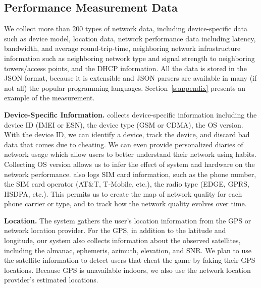 \subsection{Performance Measurement Data}
\label{ss:measurements}
We collect more than 200 types of network data, including device-specific data such as device model,
location data, network performance data including latency, bandwidth, and average round-trip-time,
neighboring network infrastructure information such as neighboring network type and signal strength to
neighboring towers/access points, and the DHCP information. All the data is stored in the JSON format,
because it is extensible and JSON parsers are available in many (if not all) the popular programming
languages. Section~\ref{s:appendix} presents an example of the measurement. 


{\bfseries Device-Specific Information.} \name{} collects device-specific information including the device ID
(IMEI or ESN), the device type (GSM or CDMA), the OS version. With the device ID, we can
identify a device, track the device, and discard bad data that comes due to cheating. We can
even provide personalized diaries of network usage which allow users to better understand their network
using habits.
Collecting OS version allows us to infer the effect of system and hardware on the network performance. \name{} also
logs SIM card information, such as the phone number, the SIM card operator (AT\&T, T-Mobile, etc.),
the radio type (EDGE, GPRS, HSDPA, etc.).
This permits us to create the map of network quality for each phone carrier or type, and to track how the network quality
evolves over time.

{\bfseries Location.} The system gathers the user's location information from the GPS or network location provider.
For the GPS, in addition to the latitude and longitude, our system also collects information
about the observed satellites, including the almanac, ephemeris, azimuth, elevation, and SNR.
We plan to use the satellite information to detect users that cheat the game by faking their GPS locations.
Because GPS is unavailable indoors, we also use the network location provider's estimated locations.


